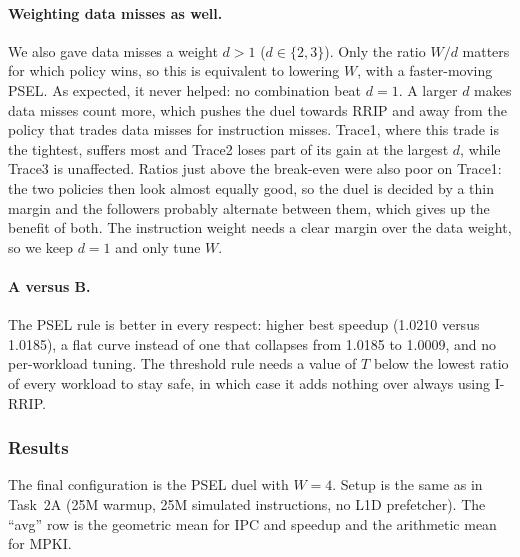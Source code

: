 \documentclass[11pt,a4paper]{article}
\begin{document}
\paragraph{Weighting data misses as well.} We also gave data misses a weight $d>1$ ($d\in\{2,3\}$). Only the ratio $W/d$ matters for which
policy wins, so this is equivalent to lowering $W$, with a faster-moving PSEL. As expected, it never helped: no combination beat $d=1$.
A larger $d$ makes data misses count more, which pushes the duel towards RRIP and away from the policy that trades data misses for
instruction misses. Trace1, where this trade is the tightest, suffers most and Trace2 loses part of its gain at the largest $d$,
while Trace3 is unaffected. Ratios just above the break-even were also poor on Trace1: the two policies then look almost equally good, so the duel
is decided by a thin margin and the followers probably alternate between them, which gives up the benefit of both. The instruction weight
needs a clear margin over the data weight, so we keep $d=1$ and only tune $W$.

\paragraph{A versus B.} The PSEL rule is better in every respect: higher best speedup (1.0210 versus 1.0185), a flat curve
instead of one that collapses from 1.0185 to 1.0009, and no per-workload tuning. The threshold rule needs a value of $T$ below
the lowest ratio of every workload to stay safe, in which case it adds nothing over always using I-RRIP.

\subsubsection{Results}

The final configuration is the PSEL duel with $W=4$. Setup is the same as in Task~2A (25M warmup, 25M simulated instructions,
no L1D prefetcher). The ``avg'' row is the geometric mean for IPC and speedup and the arithmetic mean for MPKI.
\end{document}
